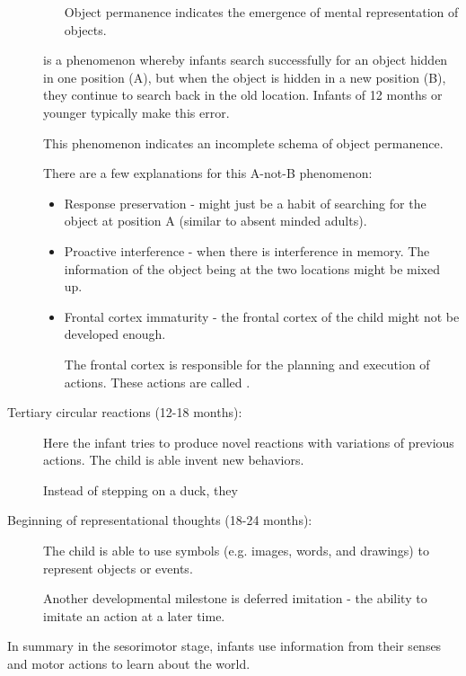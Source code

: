 \documentclass[../main/main.tex]{subfiles}
\begin{document}
\begin{description}
\begin{itemize}
                Object permanence indicates the emergence of mental representation of objects.
        \end{itemize}
 is a phenomenon whereby infants search successfully for an object hidden in one position (A), but when the object is hidden in a new position (B), they continue to search back in the old location. Infants of 12 months or younger typically make this error.
            \begin{remark} This phenomenon indicates an incomplete schema of object permanence.
                \end{remark}
                There are a few explanations for this A-not-B phenomenon:
                \begin{itemize}
                  \item Response preservation - might just be a habit of searching for the object at position A (similar to absent minded adults).
                  \item Proactive interference - when there is interference in memory. The information of the object being at the two locations might be mixed up.
                  \item Frontal cortex immaturity - the frontal cortex of the child might not be developed enough.
                        \begin{remark}
The frontal cortex is responsible for the planning and execution of actions. These actions are called .
                        \end{remark}
                \end{itemize}
  \item[Tertiary circular reactions (12-18 months):] Here the infant tries to produce novel reactions with variations of previous actions. The child is able invent new behaviors.
        \begin{example}
Instead of stepping on a duck, they
        \end{example}
  \item[Beginning of representational thoughts (18-24 months):] The child is able to use symbols (e.g. images, words, and drawings) to represent objects or events.
\begin{remark}
  Another developmental milestone is deferred imitation - the ability to imitate an action at a later time.
\end{remark}
\end{description}
In summary in the sesorimotor stage, infants use information from their senses and motor actions to learn about the world.
\end{document}
